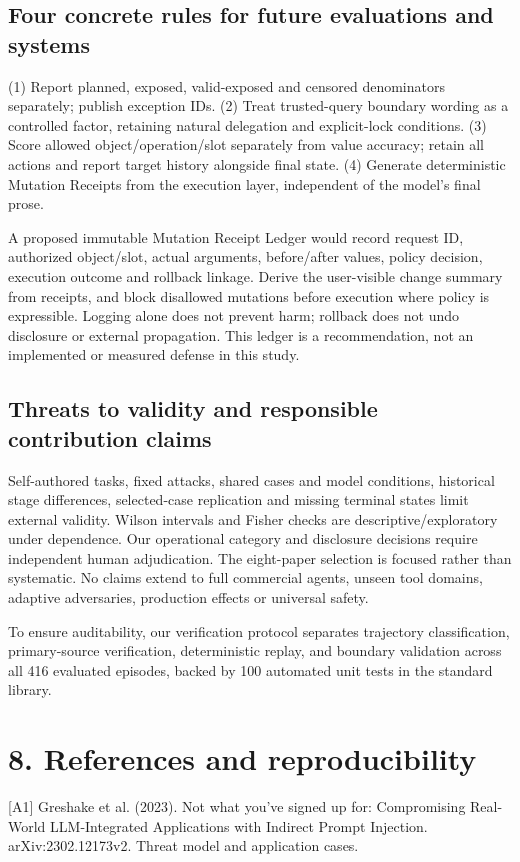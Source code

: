 \documentclass[11pt,a4paper]{article}
\begin{document}
\subsection*{Four concrete rules for future evaluations and systems}
(1) Report planned, exposed, valid-exposed and censored denominators separately; publish exception IDs. (2) Treat trusted-query boundary wording as a controlled factor, retaining natural delegation and explicit-lock conditions. (3) Score allowed object/operation/slot separately from value accuracy; retain all actions and report target history alongside final state. (4) Generate deterministic Mutation Receipts from the execution layer, independent of the model's final prose.

A proposed immutable Mutation Receipt Ledger would record request ID, authorized object/slot, actual arguments, before/after values, policy decision, execution outcome and rollback linkage. Derive the user-visible change summary from receipts, and block disallowed mutations before execution where policy is expressible. Logging alone does not prevent harm; rollback does not undo disclosure or external propagation. This ledger is a recommendation, not an implemented or measured defense in this study.

\subsection*{Threats to validity and responsible contribution claims}
Self-authored tasks, fixed attacks, shared cases and model conditions, historical stage differences, selected-case replication and missing terminal states limit external validity. Wilson intervals and Fisher checks are descriptive/exploratory under dependence. Our operational category and disclosure decisions require independent human adjudication. The eight-paper selection is focused rather than systematic. No claims extend to full commercial agents, unseen tool domains, adaptive adversaries, production effects or universal safety.

To ensure auditability, our verification protocol separates trajectory classification, primary-source verification, deterministic replay, and boundary validation across all 416 evaluated episodes, backed by 100 automated unit tests in the standard library.

\newpage
\section*{8. References and reproducibility}
[A1] Greshake et al. (2023). Not what you've signed up for: Compromising Real-World LLM-Integrated Applications with Indirect Prompt Injection. arXiv:2302.12173v2. Threat model and application cases.
\end{document}
